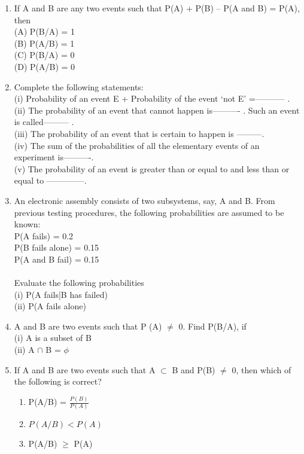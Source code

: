 \begin{enumerate}[label=\thesection.\arabic*.,ref=\thesection.\theenumi]
\item If A and B are any two events such that P(A) + P(B) – P(A and B) = P(A), then\\
(A) P(B/A) = 1 \\
(B) P(A/B) = 1\\
(C) P(B/A) = 0 \\
(D) P(A/B) = 0\\
\item Complete the following statements:\\
 (i) Probability of an event E + Probability of the event ‘not E’ =----------- .\\
 (ii) The probability of an event that cannot happen is---------- . Such an event is called--------- .\\
 (iii) The probability of an event that is certain to happen is ---------.\\
 (iv) The sum of the probabilities of all the elementary events of an experiment is----------.\\ (v) The probability of an event is greater than or equal to and less than or equal to --------------.\\\item An electronic assembly consists of two subsystems, say, A and B. From previous testing procedures, the following probabilities are assumed to be known:\\
P(A fails) = 0.2\\
P(B fails alone) = 0.15\\
P(A and B fail) = 0.15\\
\\Evaluate the following probabilities\\
(i) P(A fails|B has failed) \\
(ii) P(A fails alone)\\
\item A and B are two events such that P (A) $\neq$ 0. Find P(B/A), if\\
(i) A is a subset of B \\
(ii) A $\cap$ B = $\phi$\\
\solution

\item If A and B are two events such that A $\subset$ B and P(B) $\neq$ 0, then which of the following is correct?\\
\begin{enumerate}
\item P(A/B) = $\frac{P(B)}{P(A)}$
\item $P(A/B) < P(A)$
\item P(A/B) $\geq$ P(A)

\end{enumerate}
\end{enumerate}
